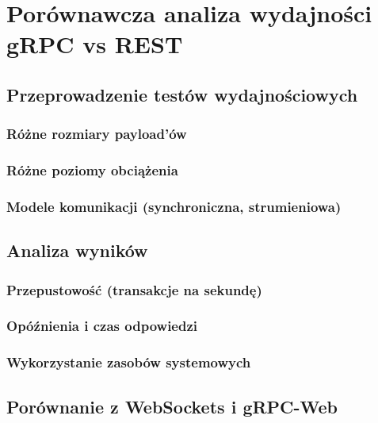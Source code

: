 \cleardoublepage

\chapter{Porównawcza analiza wydajności gRPC vs REST}
\label{cha:AnalizaWydajnosci}

\section{Przeprowadzenie testów wydajnościowych}
\label{sec:TestyWydajnosciowe}

\subsection{Różne rozmiary payload'ów}
\label{subsec:RozneRozmiary}

\subsection{Różne poziomy obciążenia}
\label{subsec:RozneObciazenia}

\subsection{Modele komunikacji (synchroniczna, strumieniowa)}
\label{subsec:ModelKomunikacji}

\section{Analiza wyników}
\label{sec:AnalizaWynikow}

\subsection{Przepustowość (transakcje na sekundę)}
\label{subsec:Przepustowosc}

\subsection{Opóźnienia i czas odpowiedzi}
\label{subsec:Opoznienia}

\subsection{Wykorzystanie zasobów systemowych}
\label{subsec:WykorzystanieZasobow}

\section{Porównanie z WebSockets i gRPC-Web}
\label{sec:PorowanieWebSockets}
